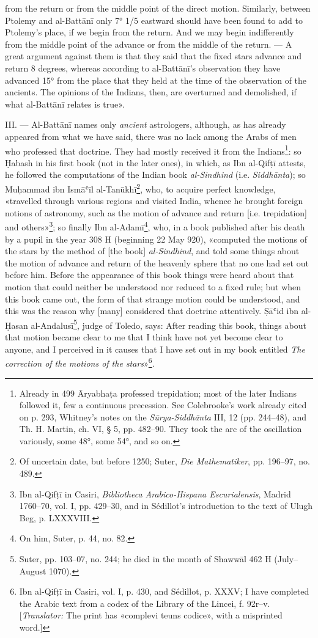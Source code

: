 \documentclass[11pt]{article}
\begin{document}
from the return or from the middle point of the direct motion. Similarly, between Ptolemy and al-Battānī only 7° 1/5 eastward should have been found to add to Ptolemy's place, if we begin from the return. And we may begin indifferently from the middle point of the advance or from the middle of the return. — A great argument against them is that they said that the fixed stars advance and return 8 degrees, whereas according to al-Battānī's observation they have advanced 15° from the place that they held at the time of the observation of the ancients. The opinions of the Indians, then, are overturned and demolished, if what al-Battānī relates is true».\par
\par III. — Al-Battānī names only \emph{ancient} astrologers, although, as has already appeared from what we have said, there was no lack among the Arabs of men who professed that doctrine. They had mostly received it from the Indians\footnote{Already in 499 Āryabhaṭa professed trepidation; most of the later Indians followed it, few a continuous precession. See Colebrooke's work already cited on p. 293, Whitney's notes on the \emph{Sūrya-Siddhānta} III, 12 (pp. 244–48), and Th. H. Martin, ch. VI, § 5, pp. 482–90. They took the arc of the oscillation variously, some 48°, some 54°, and so on.}: so Ḥabash in his first book (not in the later ones), in which, as Ibn al-Qifṭī attests, he followed the computations of the Indian book \emph{al-Sindhind} (i.e. \emph{Siddhānta}); so Muḥammad ibn Ismāʿīl al-Tanūkhī\footnote{Of uncertain date, but before 1250; Suter, \emph{Die Mathematiker}, pp. 196–97, no. 489.}, who, to acquire perfect knowledge, «travelled through various regions and visited India, whence he brought foreign notions of astronomy, such as the motion of advance and return [i.e. trepidation] and others»\footnote{Ibn al-Qifṭī in Casiri, \emph{Bibliotheca Arabico-Hispana Escurialensis}, Madrid 1760–70, vol. I, pp. 429–30, and in Sédillot's introduction to the text of Ulugh Beg, p. LXXXVIII.}; so finally Ibn al-Adamī\footnote{On him, Suter, p. 44, no. 82.}, who, in a book published after his death by a pupil in the year 308 H (beginning 22 May 920), «computed the motions of the stars by the method of [the book] \emph{al-Sindhind}, and told some things about the motion of advance and return of the heavenly sphere that no one had set out before him. Before the appearance of this book things were heard about that motion that could neither be understood nor reduced to a fixed rule; but when this book came out, the form of that strange motion could be understood, and this was the reason why [many] considered that doctrine attentively. Ṣāʿid ibn al-Ḥasan al-Andalusī\footnote{Suter, pp. 103–07, no. 244; he died in the month of Shawwāl 462 H (July–August 1070).}, judge of Toledo, says: After reading this book, things about that motion became clear to me that I think have not yet become clear to anyone, and I perceived in it causes that I have set out in my book entitled \emph{The correction of the motions of the stars}»\footnote{Ibn al-Qifṭī in Casiri, vol. I, p. 430, and Sédillot, p. XXXV; I have completed the Arabic text from a codex of the Library of the Lincei, f. 92r–v. [\emph{Translator:} The print has «complevi teuns codice», with a misprinted word.]}.\par
\end{document}
